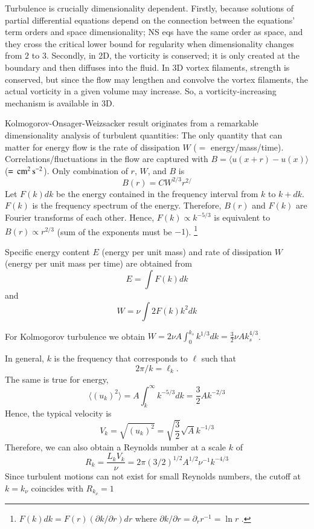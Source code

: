 \documentclass[usenatbib,twocolumn]{aastex63}
\begin{document}
\begin{appendix}
Turbulence is crucially dimensionality dependent.
Firstly, because solutions of partial differential equations depend on the connection between the equations' term orders and space dimensionality;
NS eqs have the same order as space, and they cross the critical lower bound for regularity when dimensionality changes from $2$ to $3$.
Secondly, in 2D, the vorticity is conserved; it is only created at the boundary and then diffuses into the fluid.
In 3D vortex filaments, strength is conserved, but since the flow may lengthen and convolve the vortex filaments, the actual vorticity in a given volume may increase.
So, a vorticity-increasing mechanism is available in 3D.

Kolmogorov-Onsager-Weizsacker result originates from a remarkable dimensionality analysis of turbulent quantities:
The only quantity that can matter for energy flow is the rate of dissipation $W$ ($=$ energy/mass/time).
Correlations/fluctuations in the flow are captured with $B = \langle u(x+r) - u(x) \rangle$ ($= \, \mathrm{cm}^2 \, \mathrm{s}^{-2}$).
Only combination of $r$, $W$, and $B$ is 
\begin{equation}
    B(r) = C W^{2/3} r^{2/}
\end{equation}
Let $F(k)dk$ be the energy contained in the frequency interval from $k$ to $k+dk$.
$F(k)$ is the frequency spectrum of the energy.
Therefore, $B(r)$ and $F(k)$ are Fourier transforms of each other.
Hence, $F(k) \propto k^{-5/3}$ is equivalent to $B(r) \propto r^{2/3}$ (sum of the exponents must be $-1$).
\footnote{
    $F(k) dk = F(r) (\partial k/\partial r) dr$ where $\partial k/\partial r = \partial_r r^{-1} = \ln r$ .
}

Specific energy content $E$ (energy per unit mass) and rate of dissipation $W$ (energy per unit mass per time) are obtained from
\begin{equation}
    E = \int F(k) dk
\end{equation}
and
\begin{equation}
    W = \nu \int 2 F(k) k^2 dk
\end{equation}

For Kolmogorov turbulence we obtain $W = 2 \nu A \int_0^{k_s} k^{1/3} dk = \frac{3}{2} \nu A k_s^{4/3}$.

In general, $k$ is the frequency that corresponds to $\ell$ such that 
\begin{equation}
2\pi/k = \ell_k.
\end{equation}
The same is true for energy, 
\begin{equation}
    \langle (u_k)^2 \rangle = A \int_k^\infty k^{-5/3} dk = \frac{3}{2} A k^{-2/3}
\end{equation}
Hence, the typical velocity is
\begin{equation}
    V_k = \sqrt{(u_k)^2} = \sqrt{\frac{3}{2}} \sqrt{A} k^{-1/3}
\end{equation}
Therefore, we can also obtain a Reynolds number at a scale $k$ of
\begin{equation}
    R_k = \frac{L_k V_k}{\nu} = 2\pi (3/2)^{1/2} A^{1/2} \nu^{-1} k^{-4/3}
\end{equation}
Since turbulent motions can not exist for small Reynolds numbers, the cutoff at $k = k_\nu$ coincides with $R_{k_\nu} = 1$


\end{appendix}
\end{document}
